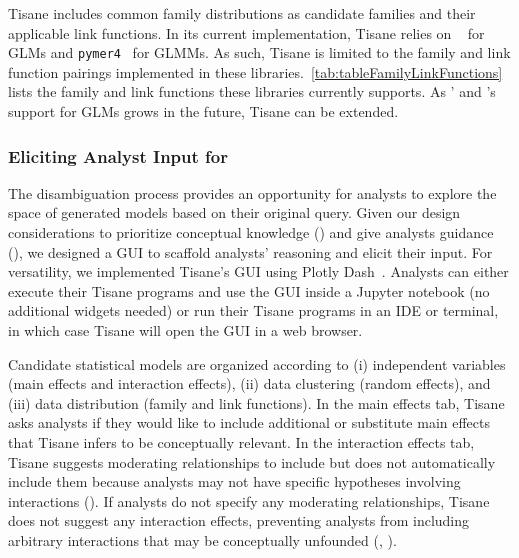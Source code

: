 Tisane includes common family distributions as candidate families and their
applicable link functions. In its current implementation, Tisane relies on
\statsmodels~\cite{statsmodelsPaper} for GLMs and
\texttt{pymer4}~\cite{jolly2018pymer4} for GLMMs. As such, Tisane is limited to
the family and link function pairings implemented in these
libraries.~\autoref{tab:tableFamilyLinkFunctions} lists the family and link
functions these libraries currently supports. As \statsmodels' and \pymer's
support for GLMs grows in the future, Tisane can be extended.



\subsubsection{Eliciting Analyst Input for \Disambiguation}\label{sec:disambiguation}
The disambiguation process provides an opportunity for analysts to explore the
space of generated models based on their original query. Given our design
considerations to prioritize conceptual knowledge (\dcConceptualKnowledge) and
give analysts guidance (\dcGuidance), we designed a GUI to scaffold analysts' reasoning and elicit their input.
For versatility, we implemented Tisane's GUI using Plotly
Dash~\cite{plotlyDash}. Analysts can either execute their Tisane programs and use the
GUI inside a Jupyter notebook (no additional widgets needed) or run
their Tisane programs in an IDE or terminal, in which case Tisane will open the
GUI in a web browser. 

\groupExerciseDisambiguation

Candidate statistical models are organized according to (i) independent
variables  (main effects and interaction effects), (ii) data clustering (random
effects), and (iii) data distribution (family and link functions). In the main
effects tab, Tisane asks analysts if they would like to include additional or
substitute main effects that Tisane infers to be conceptually relevant. In the
interaction effects tab, Tisane suggests moderating relationships to include but
does not automatically include them because analysts may not have specific
hypotheses involving interactions (\dcGuidance). If analysts do not specify any
moderating relationships, Tisane does not suggest any interaction effects,
preventing analysts from including arbitrary interactions that may be
conceptually unfounded (\dcConceptualKnowledge, \dcValidity).

